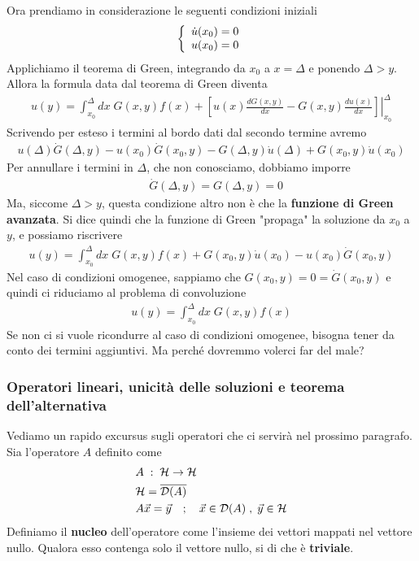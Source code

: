 Ora prendiamo in considerazione le seguenti condizioni iniziali
\begin{align}
	\left\{ \begin{array}{cc} \dot{u}(x_0)=0\\ u(x_0)=0 \end{array} \right.
\end{align}
Applichiamo il teorema di Green, integrando da $x_0$ a $x = \Delta$ e ponendo $\Delta > y$. 
Allora la formula data dal teorema di Green diventa
\begin{align}
	u(y) = \int_{x_0}^{\Delta} dx \; G(x,y) f(x) + \left.\left[ u(x) \frac{dG(x,y)}{dx} - G(x,y) \frac{du(x)}{dx} \right]\right|_{x_0}^\Delta
\end{align}
Scrivendo per esteso i termini al bordo dati dal secondo termine avremo
\begin{align}
	u(\Delta) \dot{G}(\Delta,y) - u(x_0) \dot{G}(x_0,y) - G(\Delta,y) \dot{u}(\Delta) + G(x_0,y) \dot{u}(x_0) 
\end{align}
Per annullare i termini in $\Delta$, che non conosciamo, dobbiamo imporre 
\begin{align}
	&\dot{G}(\Delta, y) = G(\Delta, y) = 0	
\end{align}
Ma, siccome $\Delta>y$, questa condizione altro non è che la \textbf{funzione di Green avanzata}. Si dice quindi che la funzione di Green "propaga" la soluzione da $x_0$ a $y$, e possiamo riscrivere
\begin{align}
	u(y) = \int_{x_0}^{\Delta} dx \; G(x,y) f(x) +  G(x_0,y) \dot{u}(x_0) - u(x_0) \dot{G}(x_0,y) 
\end{align}
Nel caso di condizioni omogenee, sappiamo che $G(x_0,y) = 0 = \dot{G}(x_0,y)$ e quindi ci riduciamo al problema di convoluzione
\begin{align}
	u(y) = \int_{x_0}^{\Delta} dx \; G(x,y) f(x)
\end{align}
Se non ci si vuole ricondurre al caso di condizioni omogenee, bisogna tener da conto dei termini aggiuntivi. Ma perché dovremmo volerci far del male?

\subsubsection{Operatori lineari, unicità delle soluzioni e teorema dell'alternativa}

Vediamo un rapido excursus sugli operatori che ci servirà nel prossimo paragrafo. 
Sia l'operatore $A$ definito come
\begin{align}
	&A \; : \; \mathcal{H} \to \mathcal{H}\\
	&\mathcal{H} = \overline{\mathcal{D}(A)}\\
	&A \vec{x} = \vec{y} \quad ; \quad \vec{x} \in \mathcal{D}(A) \; , \; \vec{y} \in \mathcal{H} \label{syseq}
\end{align}
Definiamo il \textbf{nucleo} dell'operatore come l'insieme dei vettori mappati nel vettore nullo. Qualora esso contenga solo il vettore nullo, si di che è \textbf{triviale}.

